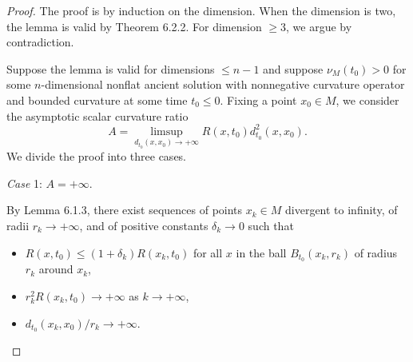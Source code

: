 \begin{proof}
The proof is by induction on the dimension. When the dimension is
two, the lemma is valid by Theorem 6.2.2. For dimension $\geq 3$,
we argue by contradiction.

Suppose the lemma is valid for dimensions $\leq n-1$ and suppose
$\nu_{M}(t_0) > 0$ for some $n$-dimensional nonflat ancient
solution with nonnegative curvature operator and bounded curvature
at some time $t_0 \leq 0$. Fixing a point $x_0 \in M$, we consider
the asymptotic scalar curvature ratio
$$
A=\limsup_{d_{t_0}(x,x_0)\rightarrow+\infty}
R(x,t_0)d^2_{t_0}(x,x_0).
$$
We divide the proof into three cases.

\medskip
{\it Case} 1: $A=+\infty$.

\smallskip
By Lemma 6.1.3, there exist sequences of points $x_k \in M$
divergent to infinity, of radii $r_k \rightarrow +\infty$, and of
positive constants $\delta_k \rightarrow 0$ such that
\begin{itemize}
\item[(i)] $R(x,t_0)\leq(1+\delta_k)R(x_k,t_0)$ for all $x$ in the
ball $B_{t_0}(x_k,r_k)$ of radius $r_k$ around $x_k$, \item[(ii)]
$r^2_kR(x_k,t_0)\rightarrow+\infty$ as $k\rightarrow+\infty$,
\item[(iii)] $d_{t_0}(x_k,x_0)/r_k\rightarrow+\infty$.
\end{itemize}


\end{proof}

